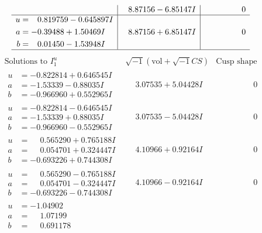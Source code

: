 \documentclass[1p]{elsarticle_modified}
\theoremstyle{definition}
\newcommand{\I}{\sqrt{-1}}
\begin{document}
$$\begin{array}{c|c|c}
 & \phantom{-}8.87156 - 6.85147 I & \phantom{-0.000000 } 0 \\ \hline\begin{aligned}
u &= \phantom{-}0.819759 - 0.645897 I \\
a &= -0.39488 + 1.50469 I \\
b &= \phantom{-}0.01450 - 1.53948 I\end{aligned}
 & \phantom{-}8.87156 + 6.85147 I & \phantom{-0.000000 } 0\\
 \hline 
 \end{array}$$\newpage$$\begin{array}{c|c|c}  
\text{Solutions to }I^u_{1}& \I (\text{vol} + \sqrt{-1}CS) & \text{Cusp shape}\\
 \hline 
\begin{aligned}
u &= -0.822814 + 0.646545 I \\
a &= -1.53339 - 0.88035 I \\
b &= -0.966960 + 0.552965 I\end{aligned}
 & \phantom{-}3.07535 + 5.04428 I & \phantom{-0.000000 } 0 \\ \hline\begin{aligned}
u &= -0.822814 - 0.646545 I \\
a &= -1.53339 + 0.88035 I \\
b &= -0.966960 - 0.552965 I\end{aligned}
 & \phantom{-}3.07535 - 5.04428 I & \phantom{-0.000000 } 0 \\ \hline\begin{aligned}
u &= \phantom{-}0.565290 + 0.765188 I \\
a &= \phantom{-}0.054701 + 0.324447 I \\
b &= -0.693226 + 0.744308 I\end{aligned}
 & \phantom{-}4.10966 + 0.92164 I & \phantom{-0.000000 } 0 \\ \hline\begin{aligned}
u &= \phantom{-}0.565290 - 0.765188 I \\
a &= \phantom{-}0.054701 - 0.324447 I \\
b &= -0.693226 - 0.744308 I\end{aligned}
 & \phantom{-}4.10966 - 0.92164 I & \phantom{-0.000000 } 0 \\ \hline\begin{aligned}
u &= -1.04902\phantom{ +0.000000I} \\
a &= \phantom{-}1.07199\phantom{ +0.000000I} \\
b &= \phantom{-}0.691178\phantom{ +0.000000I}\end{aligned}

\end{array}$$
\end{document}
